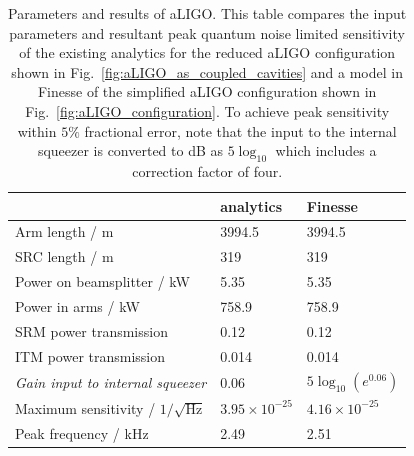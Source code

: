 \documentclass[aps,pra,superscriptaddress,reprint,nofootinbib]{revtex4-1}
\begin{document}
\begin{table}[ht]
	\centering
	\begin{tabular}{l|ll}
	 & analytics & Finesse \\ \hline
	Arm length / m & 3994.5 & 3994.5 \\
	SRC length / m & 319 & 319 \\
	Power on beamsplitter / kW & 5.35 & 5.35 \\
	Power in arms / kW & 758.9 & 758.9 \\
	SRM power transmission & 0.12 & 0.12 \\
	ITM power transmission & 0.014 & 0.014 \\
	\textit{Gain input to internal squeezer} & 0.06 & $5 \log_{10}(e^{0.06})$ \\
	Maximum sensitivity / $1/\sqrt{\mathrm{Hz}}$ & $3.95 \times 10^{-25}$ & $4.16 \times 10^{-25}$ \\
	Peak frequency / kHz & 2.49 & 2.51
	\end{tabular}%
	\caption{Parameters and results of aLIGO. This table compares the input parameters and resultant peak quantum noise limited sensitivity of the existing analytics for the reduced aLIGO configuration shown in Fig.~\ref{fig:aLIGO_as_coupled_cavities} and a model in Finesse of the simplified aLIGO configuration shown in Fig.~\ref{fig:aLIGO_configuration}. To achieve peak sensitivity within $5\%$ fractional error, note that the input to the internal squeezer is converted to dB as $5 \log_{10}$ which includes a correction factor of four.}
	\label{tab:aLIGO_parameters}
\end{table}
\end{document}
